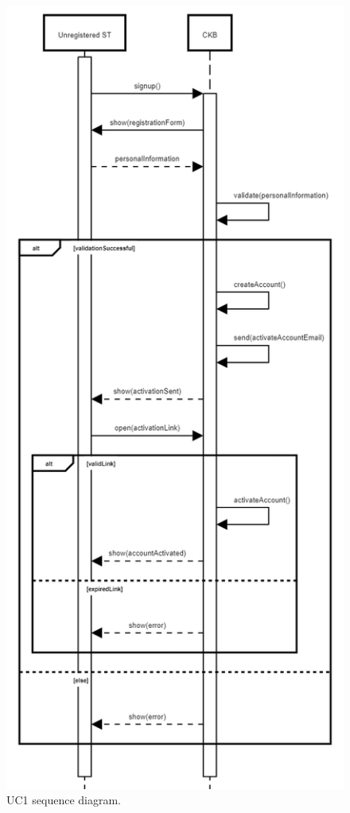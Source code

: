 \begin{center}
  \begin{figure} [H]
    \begin{center}
        \includegraphics[width=\textwidth,height=\textheight,keepaspectratio]{Images/UseCaseDiagrams/UC1.png}
        \caption{UC1 sequence diagram.}
        \label{fig: UC1_sequence_diagram}
    \end{center}
  \end{figure}
\end{center}

